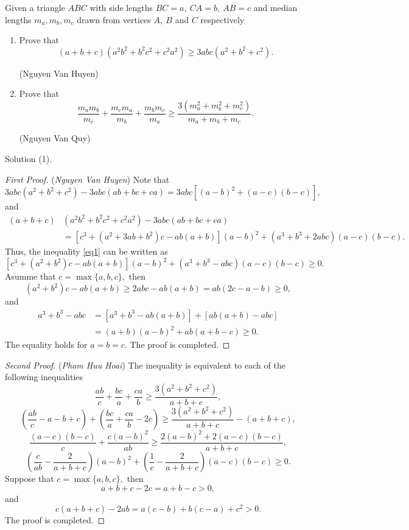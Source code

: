 \documentclass[12pt,a4paper]{book}
\begin{document}
\begin{pro}
Given a triangle $ABC$ with side lengths $BC=a,\ CA=b,\ AB=c$ and median lengths $ m_a,m_b,m_c$ drawn from vertices $A,\ B $ and $ C$ respectively
\begin{enumerate} [(1)]
\item Prove that
\begin{equation}\label{eq1}
(a+b+c)(a^2b^2+b^2c^2+c^2a^2) \geqslant 3abc(a^2+b^2+c^2).
\end{equation}
\begin{flushright}(Nguyen Van Huyen)\end{flushright}
\item Prove that
\[\frac{m_am_b}{m_c}+\frac{m_cm_a}{m_b}+\frac{m_bm_c}{m_a} \ge \frac{3(m_a^2+m_b^2+m_c^2)}{m_a+m_b+m_c}.\]
\begin{flushright}(Nguyen Van Quy)\end{flushright}
\end{enumerate}
\end{pro}

{\cmss\problemColor Solution (1).}

\begin{proof}[\cmss First Proof] (\textit{Nguyen Van Huyen}) Note that
\[3abc(a^2+b^2+c^2) - 3abc(ab+bc+ca) = 3abc[(a-b)^2+(a-c)(b-c)],\]
and
\[\begin{aligned}
(a+b+c)&(a^2b^2+b^2c^2+c^2a^2) - 3abc(ab+bc+ca) 
\\& = [c^3+(a^2+3ab+b^2)c-ab(a+b)](a-b)^2+(a^3+b^3+2abc)(a-c)(b-c).
\end{aligned}\]
Thus, the inequality \eqref{eq1} can be written as
\[\left[c^3+(a^2+b^2)c-ab(a+b)\right](a-b)^2+(a^3+b^3-abc)(a-c)(b-c) \geqslant 0.\]
Asumme that $c= \max\{a,b,c\},$ then
\[(a^2+b^2)c-ab(a+b) \geqslant 2abc-ab(a+b) = ab(2c-a-b) \geqslant 0,\]
and
\[\begin{aligned}
a^3+b^3-abc &= [a^3+b^3-ab(a+b)] + [ab(a+b)-abc] \\&
= (a+b)(a-b)^2+ab(a+b-c) \geqslant 0.
\end{aligned}\]
The equality holds for $a=b=c.$ The proof is completed.
\end{proof}

\begin{proof}[\cmss Second Proof] (\textit{Pham Huu Hoai}) The inequality is equivalent to each of the following inequalities 
\[\frac{ab}{c}+\frac{bc}{a}+\frac{ca}{b} \ge \frac{3(a^2+b^2+c^2)}{a+b+c},\]
\[\left(\frac{ab}{c}-a-b+c\right) + \left(\frac{bc}{a}+\frac{ca}{b}-2c\right) \ge \frac{3(a^2+b^2+c^2)}{a+b+c}-(a+b+c),\]
$$ \frac{(a-c)(b-c)}{c}+\frac{c(a-b)^2}{ab}\ge \frac{2(a-b)^2+2(a-c)(b-c)}{a+b+c},$$
$$ \left(\frac{c}{ab}-\frac{2}{a+b+c}\right)(a-b)^2+\left(\frac{1}{c}-\frac{2}{a+b+c}\right)(a-c)(b-c) \ge 0.$$
Suppose that $c = \max \{a,b,c\},$ then
\[a+b+c-2c = a+b-c > 0,\]
and
\[c(a+b+c)-2ab = a(c-b) + b(c-a)  +c^2 > 0.\]
The proof is completed.
\end{proof}
\end{document}
